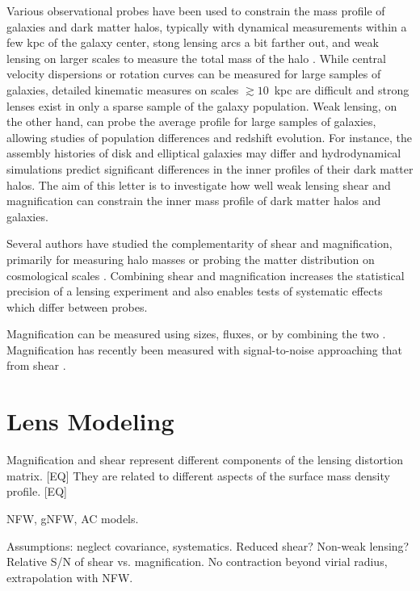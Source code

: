 \documentclass[12pt]{emulateapj}
\begin{document}
Various observational probes have been used to constrain the mass
profile of galaxies and dark matter halos, typically with dynamical
measurements within a few kpc of the galaxy center, stong lensing arcs
a bit farther out, and weak lensing on larger scales to measure the
total mass of the halo \citep[e.g.,][]{Sand2004, Koopmans2006, Gavazzi2007,
  Jiang2007, Auger2010, Schulz2010, Newman2013a}.
While central velocity dispersions or rotation curves can be measured
for large samples of galaxies, detailed kinematic measures on scales
$\gtrsim10$~kpc are difficult and strong lenses exist in only a sparse
sample of the galaxy population. Weak lensing, on the other hand, can
probe the average profile for large samples of galaxies, allowing
studies of population differences and redshift evolution. For
instance, the assembly histories of disk and elliptical galaxies may
differ and hydrodynamical simulations predict significant differences
in the inner profiles of their dark matter halos. 
The aim of this letter is to investigate how well weak lensing shear
and magnification can constrain the inner mass profile of dark matter
halos and galaxies.

Several authors have studied the complementarity of shear and
magnification, primarily for measuring halo masses
\citep{Bartelmann1996, Bridle1998, Schneider2000, vanWaerbeke2010b,
  Rozo2010, Umetsu2011} or probing the matter distribution on
cosmological scales \citep{vanWaerbeke2010a, Casaponsa2013,
  Duncan2013, Krause2013}. Combining shear and magnification increases
the statistical precision of a lensing experiment and also enables
tests of systematic effects which differ between probes.

Magnification can be measured using sizes, fluxes, or by combining the
two \citep{}. Magnification has recently been measured with
signal-to-noise approaching that from shear \citep{Scranton2005, Hildebrandt2009,
  Menard2010, Huff2011, Ford2012, Schmidt2012}.

\section{Lens Modeling}

Magnification and shear represent different components of the
lensing distortion matrix. [EQ] They are related to different aspects of
the surface mass density profile. [EQ]

NFW, gNFW, AC models.

Assumptions: neglect covariance, systematics. Reduced shear? Non-weak
lensing? Relative S/N of shear vs. magnification. No contraction
beyond virial radius, extrapolation with NFW.
\end{document}
